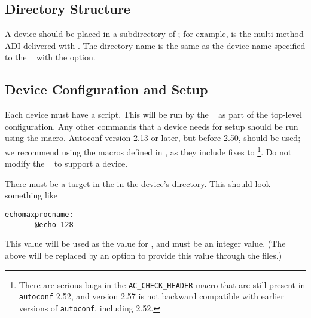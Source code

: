\subsection{Directory Structure}
\label{sec:adi3-dirs}
A device should be placed in a subdirectory of ;
for example,  is the multi-method ADI
delivered with \mpich.  The directory name is the same as the device
name specified to the \mpich\  with the
 option.

\subsection{Device Configuration and Setup}
\label{sec:adi3-setup}
Each device must have a  script.  This will be run by
the \mpich\  as part of the top-level configuration.
Any other commands that a device needs for setup should be run using
the   macro.  Autoconf version
2.13 or later, but before 2.50, should be used; we recommend using the
macros defined in 
, as they include fixes to
\footnote{There are serious bugs in the
\texttt{AC_CHECK_HEADER} macro that are still present in
\texttt{autoconf} 2.52, and version 2.57 is not backward compatible
with earlier versions of \texttt{autoconf}, including 2.52.}.
Do not modify the \mpich\  to support a device.

There must be a  target in the 
in the device's directory.  This should look something like
\begin{verbatim}
echomaxprocname:
       @echo 128
\end{verbatim}
This value will be used as the value for
, and must be an integer value.
(The above will be replaced by an option to provide this value through
the  files.)
